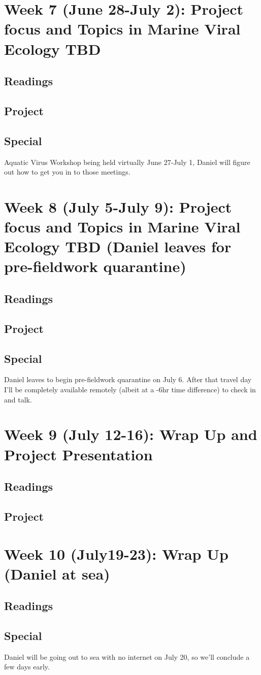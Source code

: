 \documentclass[11pt]{amsart}
\begin{document}
\section{Week 7 (June 28-July 2): Project focus and Topics in Marine Viral Ecology TBD}
\subsection{Readings}
\subsection{Project}
\subsection{Special} Aquatic Virus Workshop being held virtually June 27-July 1, Daniel will figure out how to get you in to those meetings. 
\section{Week 8 (July 5-July 9): Project focus and Topics in Marine Viral Ecology TBD (Daniel leaves for pre-fieldwork quarantine)}
\subsection{Readings}
\subsection{Project}
\subsection{Special} Daniel leaves to begin pre-fieldwork quarantine on July 6. After that travel day I'll be completely available remotely (albeit at a -6hr time difference) to check in and talk.
\section{Week 9 (July 12-16): Wrap Up and Project Presentation}
\subsection{Readings}
\subsection{Project}
\section{Week 10 (July19-23): Wrap Up (Daniel at sea)}
\subsection{Readings}
\subsection{Special} Daniel will be going out to sea with no internet on July 20, so we'll conclude a few days early. 
\end{document}
